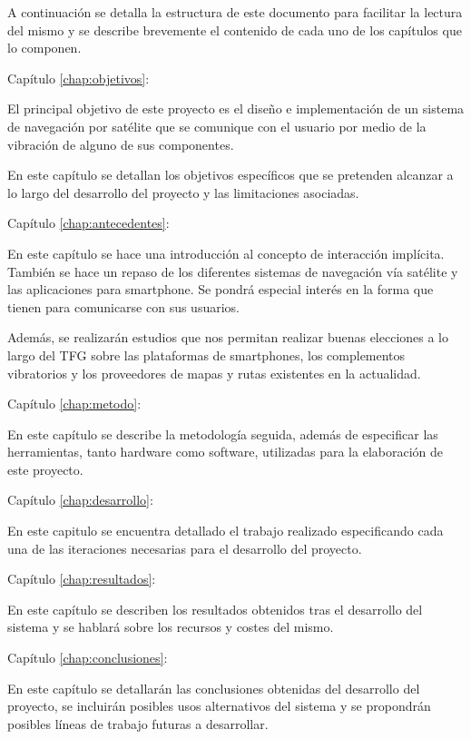 A continuación se detalla la estructura de este documento para facilitar la lectura del mismo y
se describe brevemente el contenido de cada uno de los capítulos que lo componen.

\begin{definitionlist}
  \item[Capítulo \ref{chap:objetivos}: \nameref{chap:objetivos}] 

  El principal objetivo de este proyecto es el diseño e implementación de un sistema de navegación
  por satélite que se comunique con el usuario por medio de la vibración de alguno de sus
  componentes.

  En este capítulo se detallan los objetivos específicos que se pretenden alcanzar a lo largo del
  desarrollo del proyecto y las limitaciones asociadas.

  \item[Capítulo \ref{chap:antecedentes}: \nameref{chap:antecedentes}]

  En este capítulo se hace una introducción al concepto de interacción implícita. También se hace un
  repaso de los diferentes sistemas de navegación vía satélite y las aplicaciones para
  smartphone. Se pondrá especial interés en la forma que tienen para comunicarse con sus usuarios.

  Además, se realizarán estudios que nos permitan realizar buenas elecciones a lo largo del
  \acs{TFG} sobre las plataformas de smartphones, los complementos vibratorios y los proveedores de
  mapas y rutas existentes en la actualidad.

  \item[Capítulo \ref{chap:metodo}: \nameref{chap:metodo}]

  En este capítulo se describe la metodología seguida, además de especificar las herramientas,
  tanto hardware como software, utilizadas para la elaboración de este proyecto.

  \item[Capítulo \ref{chap:desarrollo}: \nameref{chap:desarrollo}]

  En este capitulo se encuentra detallado el trabajo realizado especificando cada una de las
  iteraciones necesarias para el desarrollo del proyecto.

  \item[Capítulo \ref{chap:resultados}: \nameref{chap:resultados}]

  En este capítulo se describen los resultados obtenidos tras el desarrollo del sistema y se hablará
  sobre los recursos y costes del mismo.

  \item[Capítulo \ref{chap:conclusiones}: \nameref{chap:conclusiones}]

  En este capítulo se detallarán las conclusiones obtenidas del desarrollo del proyecto, se
  incluirán posibles usos alternativos del sistema y se propondrán posibles líneas de trabajo
  futuras a desarrollar.

\end{definitionlist}

